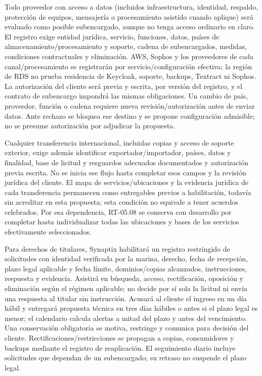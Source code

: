 Todo proveedor con acceso a datos (incluidos infraestructura, identidad, respaldo, protección de equipos, mensajería o procesamiento asistido cuando aplique) será evaluado como posible subencargado, aunque no tenga acceso ordinario en claro. El registro exige entidad jurídica, servicio, funciones, datos, países de almacenamiento/procesamiento y soporte, cadena de subencargados, medidas, condiciones contractuales y eliminación. AWS, Sophos y los proveedores de cada canal/procesamiento se registrarán por servicio/configuración efectiva; la región de RDS no prueba residencia de Keycloak, soporte, backups, Textract ni Sophos. La autorización del cliente será previa y escrita, por versión del registro, y el contrato de subencargo impondrá las mismas obligaciones. Un cambio de país, proveedor, función o cadena requiere nueva revisión/autorización antes de enviar datos. Ante rechazo se bloquea ese destino y se propone configuración admisible; no se presume autorización por adjudicar la propuesta.

Cualquier transferencia internacional, incluidas copias y acceso de soporte exterior, exige además identificar exportador/importador, países, datos y finalidad, base de licitud y resguardos adecuados documentados y autorización previa escrita. No se inicia ese flujo hasta completar esos campos y la revisión jurídica del cliente. El mapa de servicios/ubicaciones y la evidencia jurídica de cada transferencia permanecen como entregables previos a habilitación, todavía sin acreditar en esta propuesta; esta condición no equivale a tener acuerdos celebrados. Por esa dependencia, RT-05.08 se conserva con desarrollo por completar hasta individualizar todas las ubicaciones y bases de los servicios efectivamente seleccionados.

Para derechos de titulares, Synaptix habilitará un registro restringido de solicitudes con identidad verificada por la marina, derecho, fecha de recepción, plazo legal aplicable y fecha límite, dominios/copias alcanzados, instrucciones, respuesta y evidencia. Asistirá en búsqueda, acceso, rectificación, oposición y eliminación según el régimen aplicable; no decide por sí sola la licitud ni envía una respuesta al titular sin instrucción. Acusará al cliente el ingreso en un día hábil y entregará propuesta técnica en tres días hábiles o antes si el plazo legal es menor; el calendario calcula alertas a mitad del plazo y antes del vencimiento. Una conservación obligatoria se motiva, restringe y comunica para decisión del cliente. Rectificaciones/restricciones se propagan a copias, consumidores y backups mediante el registro de reaplicación. El seguimiento diario incluye solicitudes que dependan de un subencargado; su retraso no suspende el plazo legal.

